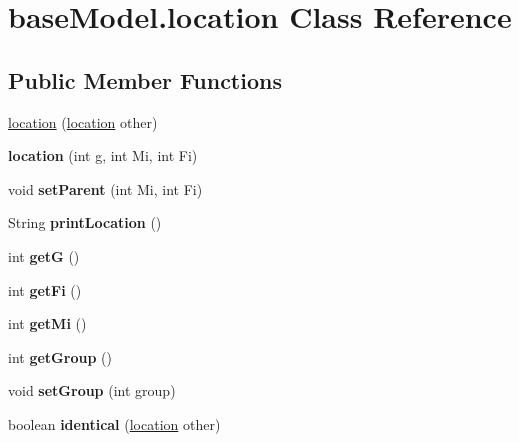 \hypertarget{classbase_model_1_1location}{}\section{base\+Model.\+location Class Reference}
\label{classbase_model_1_1location}
\subsection*{Public Member Functions}
\begin{DoxyCompactItemize}
\item 
\hyperlink{classbase_model_1_1location_aadab9af077c373db17833061220bf670}{location} (\hyperlink{classbase_model_1_1location}{location} other)
\item 
\hypertarget{classbase_model_1_1location_aae6059b21eff57e48100064dd6696837}{}{\bfseries location} (int g, int Mi, int Fi)\label{classbase_model_1_1location_aae6059b21eff57e48100064dd6696837}

\item 
\hypertarget{classbase_model_1_1location_aba41a9cb5faee0231719bae379b06b17}{}void {\bfseries set\+Parent} (int Mi, int Fi)\label{classbase_model_1_1location_aba41a9cb5faee0231719bae379b06b17}

\item 
\hypertarget{classbase_model_1_1location_a936893d5ac609b64efc5da19c2ab99e0}{}String {\bfseries print\+Location} ()\label{classbase_model_1_1location_a936893d5ac609b64efc5da19c2ab99e0}

\item 
\hypertarget{classbase_model_1_1location_a233d85c3b01c9e4bc19ec0566a1a4f91}{}int {\bfseries get\+G} ()\label{classbase_model_1_1location_a233d85c3b01c9e4bc19ec0566a1a4f91}

\item 
\hypertarget{classbase_model_1_1location_a3670794b092eab931a06f5aa5f2fb202}{}int {\bfseries get\+Fi} ()\label{classbase_model_1_1location_a3670794b092eab931a06f5aa5f2fb202}

\item 
\hypertarget{classbase_model_1_1location_a6440f520a1bb257b1efc83dda3f4c607}{}int {\bfseries get\+Mi} ()\label{classbase_model_1_1location_a6440f520a1bb257b1efc83dda3f4c607}

\item 
\hypertarget{classbase_model_1_1location_a4a0becd31fc27f4e9907ed9fa1cc9acc}{}int {\bfseries get\+Group} ()\label{classbase_model_1_1location_a4a0becd31fc27f4e9907ed9fa1cc9acc}

\item 
\hypertarget{classbase_model_1_1location_adc647e836a25cce4e5234245a65c9740}{}void {\bfseries set\+Group} (int group)\label{classbase_model_1_1location_adc647e836a25cce4e5234245a65c9740}

\item 
\hypertarget{classbase_model_1_1location_ab32f3a4cb05249ec36859e0608c1b881}{}boolean {\bfseries identical} (\hyperlink{classbase_model_1_1location}{location} other)\label{classbase_model_1_1location_ab32f3a4cb05249ec36859e0608c1b881}

\end{DoxyCompactItemize}
